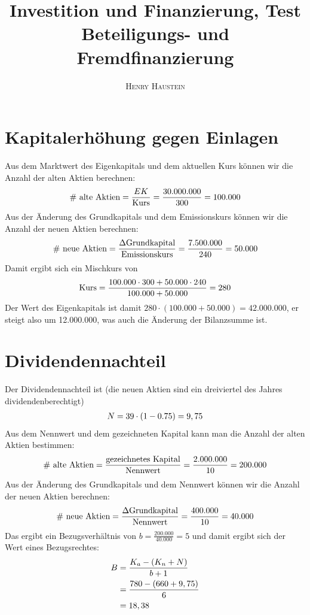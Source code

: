 \documentclass{article}
\title{\textbf{Investition und Finanzierung, Test Beteiligungs- und Fremdfinanzierung}}
\author{\textsc{Henry Haustein}}
\date{}
\begin{document}
	\maketitle
	
	\section*{Kapitalerhöhung gegen Einlagen}
	Aus dem Marktwert des Eigenkapitals und dem aktuellen Kurs können wir die Anzahl der alten Aktien berechnen:
	\begin{align}
		\text{\# alte Aktien} = \frac{EK}{\text{Kurs}} = \frac{30.000.000}{300} = 100.000 \notag
	\end{align}
	Aus der Änderung des Grundkapitals und dem Emissionskurs können wir die Anzahl der neuen Aktien berechnen:
	\begin{align}
		\text{\# neue Aktien} = \frac{\Delta\text{Grundkapital}}{\text{Emissionskurs}} = \frac{7.500.000}{240} = 50.000 \notag
	\end{align}
	Damit ergibt sich ein Mischkurs von
	\begin{align}
		\text{Kurs} = \frac{100.000\cdot 300 + 50.000\cdot 240}{100.000 + 50.000} = 280\notag
	\end{align}
	Der Wert des Eigenkapitals ist damit $280\cdot (100.000 + 50.000) = 42.000.000$, er steigt also um 12.000.000, was auch die Änderung der Bilanzsumme ist.
	
	\section*{Dividendennachteil}
	Der Dividendennachteil ist (die neuen Aktien sind ein dreiviertel des Jahres dividendenberechtigt)
	\begin{align}
		N = 39\cdot (1-0.75) = 9,75 \notag
	\end{align}
	Aus dem Nennwert und dem gezeichneten Kapital kann man die Anzahl der alten Aktien bestimmen:
	\begin{align}
		\text{\# alte Aktien} = \frac{\text{gezeichnetes Kapital}}{\text{Nennwert}} = \frac{2.000.000}{10} = 200.000 \notag
	\end{align}
	Aus der Änderung des Grundkapitals und dem Nennwert können wir die Anzahl der neuen Aktien berechnen:
	\begin{align}
		\text{\# neue Aktien} = \frac{\Delta\text{Grundkapital}}{\text{Nennwert}} = \frac{400.000}{10} = 40.000 \notag
	\end{align}
	Das ergibt ein Bezugsverhältnis von $b=\frac{200.000}{40.000} = 5$ und damit ergibt sich der Wert eines Bezugsrechtes:
	\begin{align}
		B &= \frac{K_a-(K_n+N)}{b+1} \notag \\
		&= \frac{780-(660+9,75)}{6} \notag \\
		&= 18,38 \notag
	\end{align}
	
\end{document}
